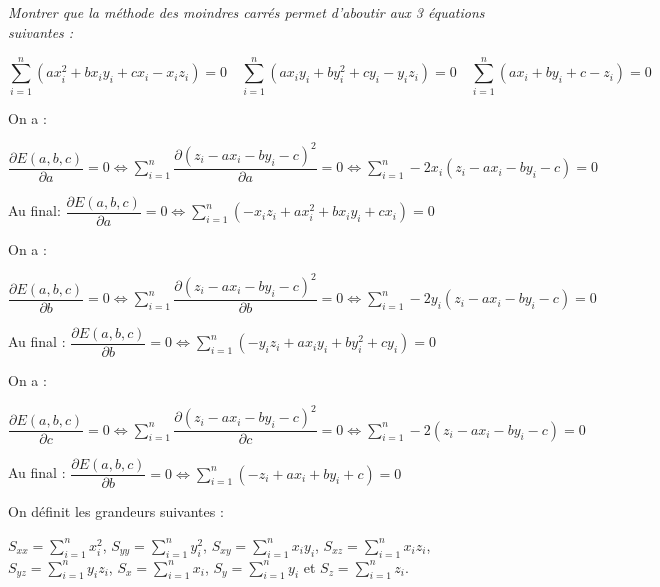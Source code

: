 \documentclass[10pt,fleqn]{article} %
\begin{document}
\subparagraph{}
\textit{Montrer que la méthode des moindres carrés permet d'aboutir aux 3 équations suivantes :}

$$
\sum\limits_{i=1}^n \left(ax_i^2 + bx_i y_i  +c x_i -x_i z_i  \right) = 0 \quad 
\sum\limits_{i=1}^n  \left(ax_iy_i  + by_i^2 +cy_i -y_i z_i  \right) = 0 \quad 
\sum\limits_{i=1}^n  \left(ax_i +  by_i+c -z_i  \right) = 0
$$

\ifprof
\begin{corrige}

On a : 

$\dfrac{\partial E(a,b,c)}{\partial a} = 0 
\Leftrightarrow  \sum\limits_{i=1}^{n} \dfrac{\partial \left(z_i -ax_i -by_i -c\right)^2}{\partial a}  = 0
\Leftrightarrow   \sum\limits_{i=1}^{n} -2x_i  \left(z_i -ax_i -by_i -c\right)  = 0
$

Au final:  $\dfrac{\partial E(a,b,c)}{\partial a} = 0 
\Leftrightarrow   \sum\limits_{i=1}^{n}   \left(-x_iz_i +ax_i^2 +bx_i y_i +cx_i\right) = 0$

On a :

$\dfrac{\partial E(a,b,c)}{\partial b} = 0
\Leftrightarrow \sum\limits_{i=1}^{n} \dfrac{\partial \left(z_i -ax_i -by_i -c\right)^2}{\partial b}  =0 
\Leftrightarrow \sum\limits_{i=1}^{n} -2y_i  \left(z_i -ax_i -by_i -c\right) = 0
$

Au final : $\dfrac{\partial E(a,b,c)}{\partial b} = 0 
\Leftrightarrow   \sum\limits_{i=1}^{n}     \left(-y_iz_i + ax_i y_i  +by_i^2 +cy_i\right)  = 0$


On a :

$\dfrac{\partial E(a,b,c)}{\partial c} = 0
\Leftrightarrow \sum\limits_{i=1}^{n} \dfrac{\partial \left(z_i -ax_i -by_i -c\right)^2}{\partial c}  =0 
\Leftrightarrow \sum\limits_{i=1}^{n} -2  \left(z_i -ax_i -by_i -c\right) = 0
$

Au final : $\dfrac{\partial E(a,b,c)}{\partial b} = 0 
\Leftrightarrow   \sum\limits_{i=1}^{n}  \left(-z_i +ax_i +by_i +c\right) = 0$

\end{corrige}

\else
\fi

\vspace{.5cm}
On définit les grandeurs suivantes : 

$S_{xx} = \sum\limits_{i=1}^n x_i^2$, $S_{yy} = \sum\limits_{i=1}^n y_i^2$, $S_{xy} = \sum\limits_{i=1}^n x_i y_i$, $S_{xz} = \sum\limits_{i=1}^n x_i z_i$, $S_{yz} = \sum\limits_{i=1}^n y_i z_i$, 
$S_x  = \sum\limits_{i=1}^n  x_i$, $S_y  = \sum\limits_{i=1}^n  y_i$ et $S_z  = \sum\limits_{i=1}^n  z_i $.
\end{document}
